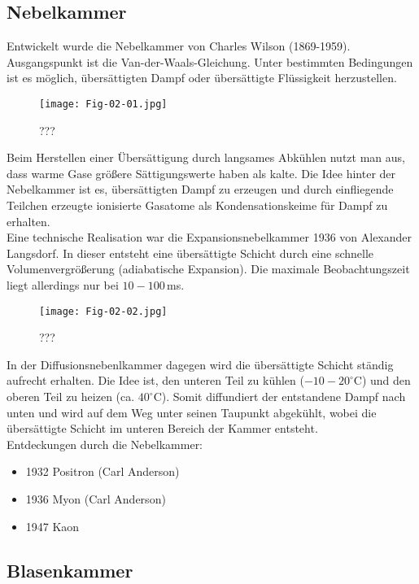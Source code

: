 \subsection{Nebelkammer}

Entwickelt wurde die Nebelkammer von Charles Wilson (1869-1959). Ausgangspunkt ist die
Van-der-Waals-Gleichung. Unter bestimmten Bedingungen ist es möglich, übersättigten Dampf oder
übersättigte Flüssigkeit herzustellen.

\begin{figure}[H]
	\centering
	\texttt{[image: Fig-02-01.jpg]}
	\caption{	 ???}
	\label{uebersaett}
\end{figure}

Beim Herstellen einer Übersättigung durch langsames Abkühlen nutzt man aus, dass warme Gase
größere Sättigungswerte haben als kalte. Die Idee hinter der Nebelkammer ist es, übersättigten Dampf
zu erzeugen und durch einfliegende Teilchen erzeugte ionisierte Gasatome als Kondensationskeime für
Dampf zu erhalten.
\\
Eine technische Realisation war die Expansionsnebelkammer 1936 von Alexander Langsdorf. In dieser
entsteht eine übersättigte Schicht durch eine schnelle Volumenvergrößerung (adiabatische Expansion).
Die maximale Beobachtungszeit liegt allerdings nur bei $10-100\,$ms.

\begin{figure}[H]
	\centering
	\texttt{[image: Fig-02-02.jpg]}
	\caption{	 ???}
	\label{expansion}
\end{figure}

In der Diffusionsnebenlkammer dagegen wird die übersättigte Schicht ständig aufrecht erhalten. Die
Idee ist, den unteren Teil zu kühlen ($-10-20^\circ$C) und den oberen Teil zu heizen (ca.
$40^\circ$C). Somit diffundiert der entstandene Dampf nach unten und wird auf dem Weg unter seinen
Taupunkt abgekühlt, wobei die übersättigte Schicht im unteren Bereich der Kammer entsteht. 
\\
Entdeckungen durch die Nebelkammer:

\begin{itemize}
  \item 1932 Positron (Carl Anderson)
  \item 1936 Myon (Carl Anderson)
  \item 1947 Kaon
\end{itemize}

\subsection{Blasenkammer}

